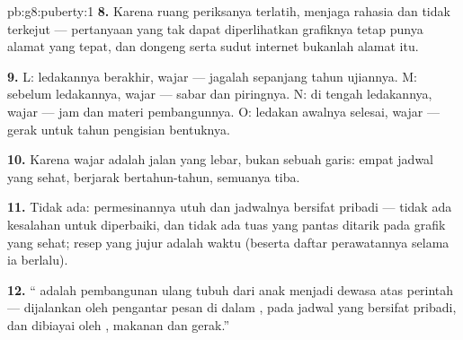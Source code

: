 \begin{solution}{pb:g8:puberty:1}
\textbf{8.} Karena ruang periksanya terlatih, menjaga rahasia
dan tidak terkejut --- pertanyaan yang tak dapat
diperlihatkan grafiknya tetap punya alamat yang tepat, dan
dongeng serta sudut internet bukanlah alamat itu.

\textbf{9.} L: ledakannya berakhir, wajar --- jagalah
 sepanjang tahun ujiannya. M: sebelum ledakannya,
wajar --- sabar dan piringnya. N: di tengah ledakannya, wajar
--- jam  dan materi pembangunnya. O: ledakan awalnya
selesai, wajar --- gerak untuk tahun pengisian bentuknya.

\textbf{10.} Karena wajar adalah jalan yang lebar, bukan
sebuah garis: empat jadwal yang sehat, berjarak bertahun-tahun,
semuanya tiba.

\textbf{11.} Tidak ada: permesinannya utuh dan jadwalnya
bersifat pribadi --- tidak ada kesalahan untuk diperbaiki,
dan tidak ada tuas yang pantas ditarik pada grafik yang
sehat; resep yang jujur adalah waktu (beserta daftar
perawatannya selama ia berlalu).

\textbf{12.} `` adalah pembangunan ulang tubuh dari
anak menjadi dewasa atas perintah  --- dijalankan oleh
pengantar pesan di dalam , pada jadwal yang bersifat
pribadi, dan dibiayai oleh , makanan dan gerak.''
\end{solution}

